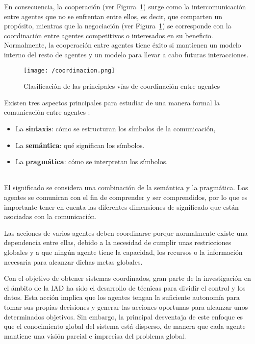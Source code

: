En consecuencia, la cooperación (ver Figura~\ref{fig:coordinacion}) surge como la intercomunicación entre agentes que no se enfrentan entre ellos, es decir, que comparten un propósito, mientras que la negociación (ver Figura~\ref{fig:coordinacion}) se corresponde con la coordinación entre agentes competitivos o interesados en su beneficio. Normalmente, la cooperación entre agentes tiene éxito si mantienen un modelo interno del resto de agentes y un modelo para llevar a cabo futuras interacciones.

\begin{figure}[!h]
\begin{center}
\texttt{[image: /coordinacion.png]}
\caption[Clasificación de las principales vías de coordinación entre agentes]{Clasificación de las principales vías de coordinación entre agentes \cite{coordinacion2}}
\label{fig:coordinacion}
\end{center}
\end{figure}

Existen tres aspectos principales para estudiar de una manera formal la comunicación entre agentes \cite{coordinacion}: 
\begin{itemize}
\item La \textbf{sintaxis}: cómo se estructuran los símbolos de la comunicación,
\item La \textbf{semántica}: qué significan los símbolos.
\item La \textbf{pragmática}: cómo se interpretan los símbolos. \\ \\
\end{itemize}

El significado se considera una combinación de la semántica y la pragmática. Los agentes se comunican con el fin de comprender y ser comprendidos, por lo que es importante tener en cuenta las diferentes dimensiones de significado que están asociadas con la comunicación.

Las acciones de varios agentes deben coordinarse porque normalmente existe una dependencia entre ellas, debido a la necesidad de cumplir unas restricciones globales y a que ningún agente tiene la capacidad, los recursos o la información necesaria para alcanzar dichas metas globales.

Con el objetivo de obtener sistemas coordinados, gran parte de la investigación en el ámbito de la \acs{IAD} ha sido el desarrollo de técnicas para dividir el control y los datos. Esta acción implica que los agentes tengan la suficiente autonomía para tomar sus propias decisiones y
generar las acciones oportunas para alcanzar unos determinados objetivos. Sin embargo, la principal desventaja de este enfoque es que el conocimiento global del sistema está disperso, de manera que cada agente mantiene una visión parcial e imprecisa del problema global.

